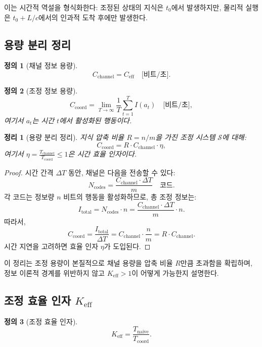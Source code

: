\documentclass[11pt,a4paper]{article}
\newtheorem{theorem}{정리}
\newtheorem{definition}{정의}
\begin{document}
이는 시간적 역설을 형식화한다: 조정된 상태의 지식은 $t_0$에서 발생하지만, 물리적 실행은 $t_0 + L/c$에서의 인과적 도착 후에만 발생한다.

\subsection{용량 분리 정리}

\begin{definition}[채널 정보 용량]
	\[
	C_{\text{channel}} = C_{\text{eff}} \quad \text{[비트/초]}.
	\]
\end{definition}

\begin{definition}[조정 정보 용량]
	\[
	C_{\text{coord}} = \lim_{T \to \infty} \frac{1}{T} \sum_{t=1}^{T} I(a_t) \quad \text{[비트/초]},
	\]
	여기서 $a_t$는 시간 $t$에서 활성화된 행동이다.
\end{definition}

\begin{theorem}[용량 분리 정리]
	\label{thm:capacity-separation}
	지식 압축 비율 $R = n/m$을 가진 조정 시스템 $\mathcal{S}$에 대해:
	\[
	C_{\text{coord}} = R \cdot C_{\text{channel}} \cdot \eta,
	\]
	여기서 $\eta = \frac{T_{\text{channel}}}{T_{\text{coord}}} \leq 1$은 시간 효율 인자이다.
\end{theorem}

\begin{proof}
	시간 간격 $\Delta T$ 동안, 채널은 다음을 전송할 수 있다:
	\[
	N_{\text{codes}} = \frac{C_{\text{channel}} \cdot \Delta T}{m} \quad \text{코드}.
	\]
	각 코드는 정보량 $n$ 비트의 행동을 활성화하므로, 총 조정 정보는:
	\[
	I_{\text{total}} = N_{\text{codes}} \cdot n = \frac{C_{\text{channel}} \cdot \Delta T}{m} \cdot n.
	\]
	따라서,
	\[
	C_{\text{coord}} = \frac{I_{\text{total}}}{\Delta T} = C_{\text{channel}} \cdot \frac{n}{m} = R \cdot C_{\text{channel}}.
	\]
	시간 지연을 고려하면 효율 인자 $\eta$가 도입된다.
\end{proof}

이 정리는 조정 용량이 본질적으로 채널 용량을 압축 비율 $R$만큼 초과함을 확립하며, 정보 이론적 경계를 위반하지 않고 $K_{\mathrm{eff}} > 1$이 어떻게 가능한지 설명한다.

\subsection{조정 효율 인자 $K_{\mathrm{eff}}$}

\begin{definition}[조정 효율 인자]
	\[
	K_{\mathrm{eff}} = \frac{T_{\text{naive}}}{T_{\text{coord}}}.
	\]
\end{definition}
\end{document}
